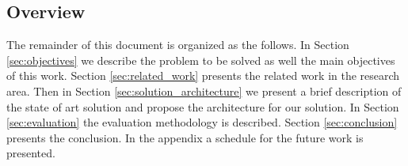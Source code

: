 \subsection{Overview}
\label{sub:overview}
The remainder of this document is organized as the follows. In Section \ref{sec:objectives}
we describe the problem to be solved as well the main objectives of this work. Section \ref{sec:related_work}
presents the related work in the research area. Then in Section \ref{sec:solution_architecture}
we present a brief description of the state of art solution and propose the architecture
for our solution. In Section \ref{sec:evaluation} the evaluation methodology is described.
Section \ref{sec:conclusion} presents the conclusion. In the appendix a schedule
for the future work is presented.
